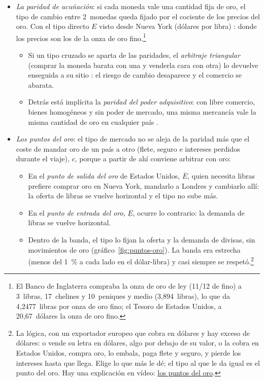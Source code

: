\documentclass[11pt]{article}
\begin{document}
\begin{itemize}
\item \emph{La paridad de acuñación}: si cada moneda vale una cantidad fija de oro, el tipo de cambio entre 2~monedas queda fijado por el cociente de los precios del oro. Con el tipo directo $E$ visto desde Nueva York (dólares por libra) :
  donde los precios son los de la onza de oro fino.\footnote{El Banco de Inglaterra compraba la onza de oro de ley (11/12 de fino) a 3~libras, 17~chelines y 10~peniques y medio (3,894~libras), lo que da 4,2477~libras por onza de oro fino; el Tesoro de Estados Unidos, a 20,67~dólares la onza de oro fino\nocite{Officer2008Gold}.}
  \begin{itemize}
  \item Si un tipo cruzado se aparta de las paridades, el \emph{arbitraje triangular} (comprar la moneda barata con una y venderla cara con otra) lo devuelve enseguida a su sitio : el riesgo de cambio desaparece y el comercio se abarata.
  \item Detrás está implícita la \emph{paridad del poder adquisitivo}: con libre comercio, bienes homogéneos y sin poder de mercado, una misma mercancía vale la misma cantidad de oro en cualquier país .
  \end{itemize}
\item \emph{Los puntos del oro}: el tipo de mercado no se aleja de la paridad más que el coste de mandar oro de un país a otro (flete, seguro e intereses perdidos durante el viaje), $c$, porque a partir de ahí conviene arbitrar con oro:
  \begin{itemize}
  \item En el \emph{punto de salida del oro} de Estados Unidos, $\overline E$, quien necesita libras prefiere comprar oro en Nueva York, mandarlo a Londres y cambiarlo allí: la oferta de libras se vuelve horizontal y el tipo no sube más.
  \item En el \emph{punto de entrada del oro}, $\underline E$, ocurre lo contrario: la demanda de libras se vuelve horizontal.
  \item Dentro de la banda, el tipo lo fijan la oferta y la demanda de divisas, sin movimientos de oro (gráfico~\ref{fig:puntos-oro}). La banda era estrecha (menos del 1~\% a cada lado en el dólar-libra) y casi siempre se respetó\nocite{Officer1996Between}.\footnote{La lógica, con un exportador europeo que cobra en dólares y hay exceso de dólares: o vende su letra en dólares, algo por debajo de su valor, o la cobra en Estados Unidos, compra oro, lo embala, paga flete y seguro, y pierde los intereses hasta que llega. Elige lo que más le dé; el tipo al que le da igual es el punto del oro. Hay una explicación en vídeo: \href{https://youtu.be/_2nYIxh3B0s?t=299}{los puntos del oro}.}
  \end{itemize}
\end{itemize}
\end{document}
